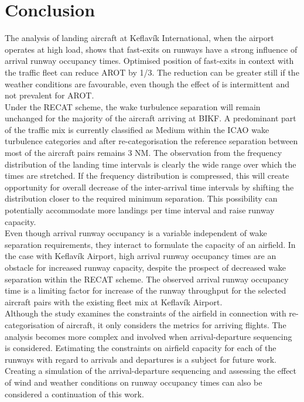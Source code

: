 \section{Conclusion\label{sec:conclusions}}
The analysis of landing aircraft at Keflavík International, when the airport operates at high load, shows that fast-exits on runways have a strong influence of arrival runway occupancy times. Optimised position of fast-exits in context with the traffic fleet can reduce AROT by 1/3. The reduction can be greater still if the weather conditions are favourable, even though the effect of is intermittent and not prevalent for AROT.\\
Under the RECAT scheme, the wake turbulence separation will remain unchanged for the majority of the aircraft arriving at BIKF. A predominant part of the traffic mix is currently classified as Medium within the ICAO wake turbulence categories and after re-categorisation the reference separation between most of the aircraft pairs remains 3 NM. The observation from the frequency distribution of the landing time intervals is clearly the wide range over which the times are stretched. If the frequency distribution is compressed, this will create opportunity for overall decrease of the inter-arrival time intervals by shifting the distribution closer to the required minimum separation. This possibility can potentially accommodate more landings per time interval and raise runway capacity.\\
Even though arrival runway occupancy is a variable independent of wake separation requirements, they interact to formulate the capacity of an airfield. In the case with Keflavík Airport, high arrival runway occupancy times are an obstacle for increased runway capacity, despite the prospect of decreased wake separation within the RECAT scheme. The observed arrival runway occupancy time is a limiting factor for increase of the runway throughput for the selected aircraft pairs with the existing fleet mix at Keflavík Airport.\\
Although the study examines the constraints of the airfield in connection with re-categorisation of aircraft, it only considers the metrics for arriving flights. The analysis becomes more complex and involved when arrival-departure sequencing is considered. Estimating the constraints on airfield capacity for each of the runways with regard to arrivals and departures is a subject for future work. Creating a simulation of the arrival-departure sequencing and assessing the effect of wind and weather conditions on runway occupancy times can also be considered a continuation of this work.



